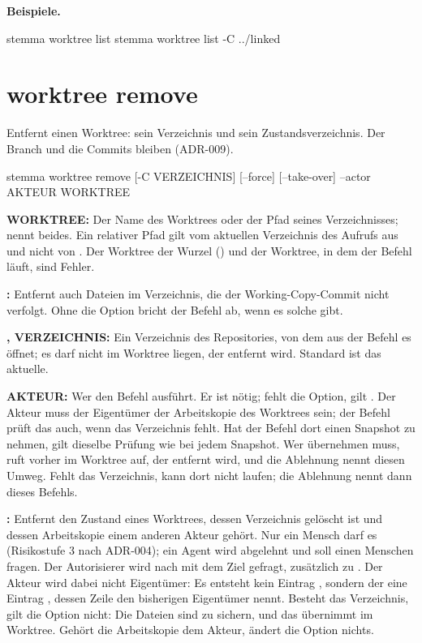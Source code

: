 {\bf Beispiele.}

\starttyping
stemma worktree list
stemma worktree list -C ../linked
\stoptyping

\section{worktree remove}

Entfernt einen Worktree: sein Verzeichnis und sein Zustandsverzeichnis. Der Branch und die
Commits bleiben (ADR-009).

\starttyping
stemma worktree remove [-C VERZEICHNIS] [--force] [--take-over] --actor AKTEUR WORKTREE
\stoptyping

\startitemize
\item {\bf WORKTREE:} Der Name des Worktrees oder der Pfad seines Verzeichnisses;
 nennt beides. Ein relativer Pfad gilt vom aktuellen Verzeichnis des Aufrufs
aus und nicht von . Der Worktree der Wurzel () und der Worktree, in dem der
Befehl läuft, sind Fehler.
\item {\bf {}:} Entfernt auch Dateien im Verzeichnis, die der Working-Copy-Commit
nicht verfolgt. Ohne die Option bricht der Befehl ab, wenn es solche gibt.
\item {\bf {},  VERZEICHNIS:} Ein Verzeichnis des Repositories, von dem
aus der Befehl es öffnet; es darf nicht im Worktree liegen, der entfernt wird.
Standard ist das aktuelle.
\item {\bf {} AKTEUR:} Wer den Befehl ausführt. Er ist nötig; fehlt die Option, gilt
. Der Akteur muss der Eigentümer der Arbeitskopie des Worktrees sein; der Befehl
prüft das auch, wenn das Verzeichnis fehlt. Hat der Befehl dort einen Snapshot zu nehmen,
gilt dieselbe Prüfung wie bei jedem Snapshot.
Wer übernehmen muss, ruft vorher  im Worktree auf, der entfernt
wird, und die Ablehnung nennt diesen Umweg.
Fehlt das Verzeichnis, kann  dort nicht laufen; die Ablehnung nennt dann
 dieses Befehls.
\item {\bf {}:} Entfernt den Zustand eines Worktrees, dessen Verzeichnis gelöscht
ist und dessen Arbeitskopie einem anderen Akteur gehört. Nur ein Mensch darf es (Risikostufe 3
nach ADR-004); ein Agent wird abgelehnt und soll einen Menschen fragen. Der Autorisierer wird nach
 mit dem Ziel  gefragt, zusätzlich zu .
Der Akteur wird dabei nicht Eigentümer: Es entsteht kein Eintrag , sondern der
eine Eintrag , dessen Zeile  den bisherigen Eigentümer
nennt. Besteht das Verzeichnis, gilt die Option nicht: Die Dateien sind zu sichern, und das
übernimmt  im Worktree. Gehört die Arbeitskopie dem Akteur, ändert die
Option nichts.
\stopitemize

